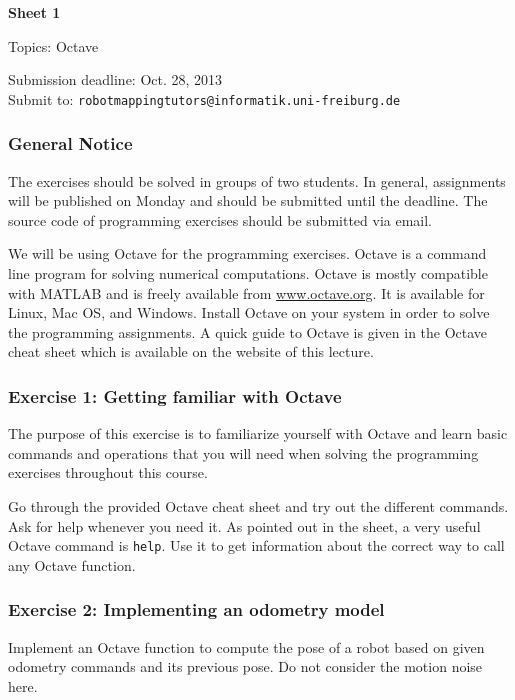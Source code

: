 \documentclass[12pt,a4paper]{article}
\begin{document}



\begin{center}
{\bf \Large Sheet 1}

{\large Topics: Octave}

Submission deadline: Oct. 28, 2013\\
Submit to: \texttt{robotmappingtutors@informatik.uni-freiburg.de}
\end{center}

\subsubsection*{General Notice}

The exercises should be solved in groups of two students. In general,
assignments will be published on Monday and should be submitted until
the deadline. The source code of programming exercises should be
submitted via email.

We will be using Octave for the programming exercises. Octave is a
command line program for solving numerical computations. Octave is
mostly compatible with MATLAB and is freely available from
\url{www.octave.org}. It is available for Linux, Mac OS, and Windows.
Install Octave on your system in order to solve the programming
assignments. A quick guide to Octave is given in the Octave cheat sheet
which is available on the website of this lecture.

\subsubsection*{Exercise 1: Getting familiar with Octave}

The purpose of this exercise is to familiarize yourself with Octave and
learn basic commands and operations that you will need when solving the
programming exercises throughout this course.

Go through the provided Octave cheat sheet and try out the different
commands. Ask for help whenever you need it. As pointed out in the
sheet, a very useful Octave command is \texttt{help}. Use it to get
information about the correct way to call any Octave function.

\subsubsection*{Exercise 2: Implementing an odometry model}

Implement an Octave function to compute the pose of a robot based on
given odometry commands and its previous pose. Do not consider the
motion noise here.
\end{document}
